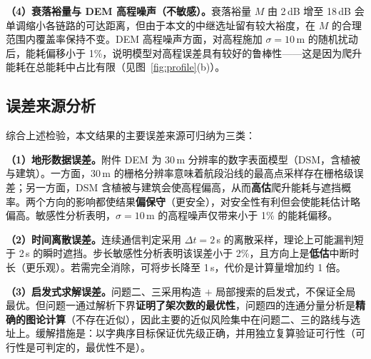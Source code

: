 \textbf{（4）衰落裕量与 DEM 高程噪声（不敏感）。}衰落裕量 $M$ 由 2\,dB 增至 18\,dB 会单调缩小各链路的可达距离，但由于本文的中继选址留有较大裕度，在 $M$ 的合理范围内覆盖率保持不变。DEM 高程噪声方面，对高程施加 $\sigma=10$\,m 的随机扰动后，能耗偏移小于 1\%，说明模型对高程误差具有较好的鲁棒性——这是因为爬升能耗在总能耗中占比有限（见图~\ref{fig:profile}(b)）。

\subsection{误差来源分析}

综合上述检验，本文结果的主要误差来源可归纳为三类：

\textbf{（1）地形数据误差。}附件 DEM 为 30\,m 分辨率的数字表面模型（DSM，含植被与建筑）。一方面，30\,m 的栅格分辨率意味着航段沿线的最高点采样存在栅格级误差；另一方面，DSM 含植被与建筑会使高程偏高，从而\textbf{高估}爬升能耗与遮挡概率。两个方向的影响都使结果\textbf{偏保守}（更安全），对安全性有利但会使能耗估计略偏高。敏感性分析表明，$\sigma=10$\,m 的高程噪声仅带来小于 1\% 的能耗偏移。

\textbf{（2）时间离散误差。}连续通信判定采用 $\Delta t=2$\,s 的离散采样，理论上可能漏判短于 2\,s 的瞬时遮挡。步长敏感性分析表明该误差小于 2\%，且方向上是\textbf{低估}中断时长（更乐观）。若需完全消除，可将步长降至 1\,s，代价是计算量增加约 1 倍。

\textbf{（3）启发式求解误差。}问题二、三采用构造 $+$ 局部搜索的启发式，不保证全局最优。但问题一通过解析下界\textbf{证明了架次数的最优性}，问题四的连通分量分析是\textbf{精确的图论计算}（不存在近似），因此主要的近似风险集中在问题二、三的路线与选址上。缓解措施是：以字典序目标保证优先级正确，并用独立复算验证可行性（可行性是可判定的，最优性不是）。
